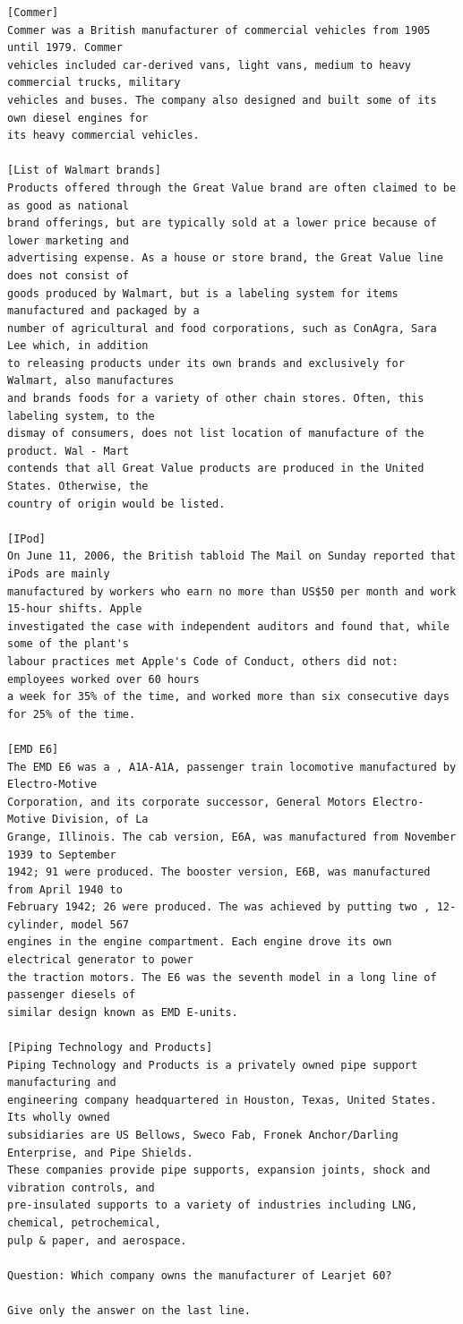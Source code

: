 \documentclass[10pt]{article}
\begin{document}
\begin{verbatim}
[Commer]
Commer was a British manufacturer of commercial vehicles from 1905 until 1979. Commer
vehicles included car-derived vans, light vans, medium to heavy commercial trucks, military
vehicles and buses. The company also designed and built some of its own diesel engines for
its heavy commercial vehicles.

[List of Walmart brands]
Products offered through the Great Value brand are often claimed to be as good as national
brand offerings, but are typically sold at a lower price because of lower marketing and
advertising expense. As a house or store brand, the Great Value line does not consist of
goods produced by Walmart, but is a labeling system for items manufactured and packaged by a
number of agricultural and food corporations, such as ConAgra, Sara Lee which, in addition
to releasing products under its own brands and exclusively for Walmart, also manufactures
and brands foods for a variety of other chain stores. Often, this labeling system, to the
dismay of consumers, does not list location of manufacture of the product. Wal - Mart
contends that all Great Value products are produced in the United States. Otherwise, the
country of origin would be listed.

[IPod]
On June 11, 2006, the British tabloid The Mail on Sunday reported that iPods are mainly
manufactured by workers who earn no more than US$50 per month and work 15-hour shifts. Apple
investigated the case with independent auditors and found that, while some of the plant's
labour practices met Apple's Code of Conduct, others did not: employees worked over 60 hours
a week for 35% of the time, and worked more than six consecutive days for 25% of the time.

[EMD E6]
The EMD E6 was a , A1A-A1A, passenger train locomotive manufactured by Electro-Motive
Corporation, and its corporate successor, General Motors Electro-Motive Division, of La
Grange, Illinois. The cab version, E6A, was manufactured from November 1939 to September
1942; 91 were produced. The booster version, E6B, was manufactured from April 1940 to
February 1942; 26 were produced. The was achieved by putting two , 12-cylinder, model 567
engines in the engine compartment. Each engine drove its own electrical generator to power
the traction motors. The E6 was the seventh model in a long line of passenger diesels of
similar design known as EMD E-units.

[Piping Technology and Products]
Piping Technology and Products is a privately owned pipe support manufacturing and
engineering company headquartered in Houston, Texas, United States. Its wholly owned
subsidiaries are US Bellows, Sweco Fab, Fronek Anchor/Darling Enterprise, and Pipe Shields.
These companies provide pipe supports, expansion joints, shock and vibration controls, and
pre-insulated supports to a variety of industries including LNG, chemical, petrochemical,
pulp & paper, and aerospace.

Question: Which company owns the manufacturer of Learjet 60?

Give only the answer on the last line.
\end{verbatim}
\end{document}
